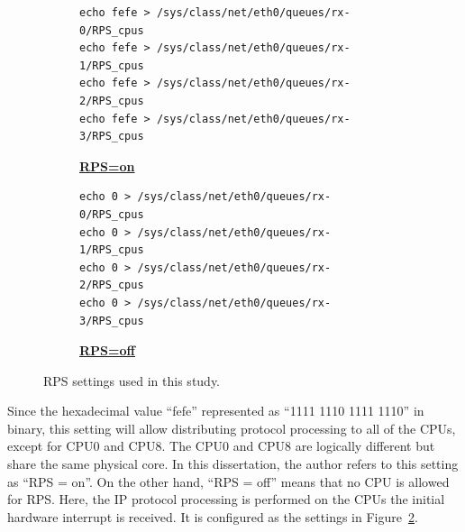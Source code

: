 \begin{figure}[h]

  \begin{subfigure}[t]{\columnwidth}
    \centering
    \begin{minipage}{0.9\columnwidth}
\begin{verbatim}
echo fefe > /sys/class/net/eth0/queues/rx-0/RPS_cpus
echo fefe > /sys/class/net/eth0/queues/rx-1/RPS_cpus
echo fefe > /sys/class/net/eth0/queues/rx-2/RPS_cpus
echo fefe > /sys/class/net/eth0/queues/rx-3/RPS_cpus
\end{verbatim}
    \end{minipage}
    \caption{\underline{\textbf{RPS=on}}}
    \label{fig:rps=on}
  \end{subfigure}

  \par\bigskip

  \begin{subfigure}[t]{\columnwidth}
    \centering
    \begin{minipage}{0.9\columnwidth}
\begin{verbatim}
echo 0 > /sys/class/net/eth0/queues/rx-0/RPS_cpus
echo 0 > /sys/class/net/eth0/queues/rx-1/RPS_cpus
echo 0 > /sys/class/net/eth0/queues/rx-2/RPS_cpus
echo 0 > /sys/class/net/eth0/queues/rx-3/RPS_cpus
\end{verbatim}
    \end{minipage}
    \caption{\underline{\textbf{RPS=off}}}
    \label{fig:rps=off}
  \end{subfigure}

  \par\bigskip
  \centering
  \begin{minipage}{0.9\columnwidth}
    \caption[RPS settings]{
      RPS settings used in this study.
    }
    \label{fig:rps_settings}
  \end{minipage}

  \par\bigskip
\end{figure}

Since the hexadecimal value \enquote{fefe} represented as \enquote{1111 1110 1111 1110} in binary, 
this setting will allow distributing protocol processing to all of the CPUs, except for CPU0 and CPU8.
The CPU0 and CPU8 are logically different but share the same physical core.
In this dissertation, the author refers to this setting as \enquote{RPS = on}.
%
On the other hand, \enquote{RPS = off} means that no CPU is allowed for RPS. 
Here, the IP protocol processing is performed on the CPUs the initial hardware interrupt is received.
It is configured as the settings in Figure~\ref{fig:rps=off}.

